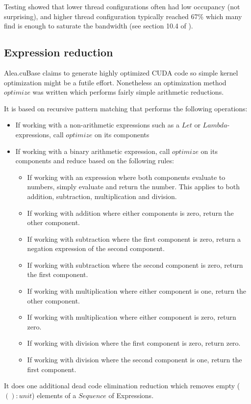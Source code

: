 Testing showed that lower thread configurations often had low occupancy (not surprising), and higher thread configuration typically reached 67\% which many find is enough to saturate the bandwidth (see section 10.4 of \cite{cudacoccupancy}).

\subsection{Expression reduction}\label{subsec:exprReduction}
Alea.cuBase claims to generate highly optimized CUDA code so simple kernel optimization might be a futile effort.
Nonetheless an optimization method $optimize$ was written which performs fairly simple arithmetic reductions.

It is based on recursive pattern matching that performs the following operations:
\begin{itemize}
\item If working with a non-arithmetic expressions such as a $Let$ or $Lambda$-expressions, call $optimize$ on its components
\item If working with a binary arithmetic expression, call $optimize$ on its components and reduce based on the following rules:
	\begin{itemize}
	\item If working with an expression where both components evaluate to numbers, simply evaluate and return the number. This applies to both addition, subtraction, multiplication and division.
	\item If working with addition where either components is zero, return the other component.
	\item If working with subtraction where the first component is zero, return a negation expression of the second component.
	\item If working with subtraction where the second component is zero, return the first component.
	\item If working with multiplication where either component is one, return the other component.
	\item If working with multiplication where either component is zero, return zero.
	\item If working with division where the first component is zero, return zero.
	\item If working with division where the second component is one, return the first component.
	\end{itemize}
\end{itemize}
It does one additional dead code elimination reduction which removes empty ($() : unit$) elements of a $Sequence$ of Expressions.

